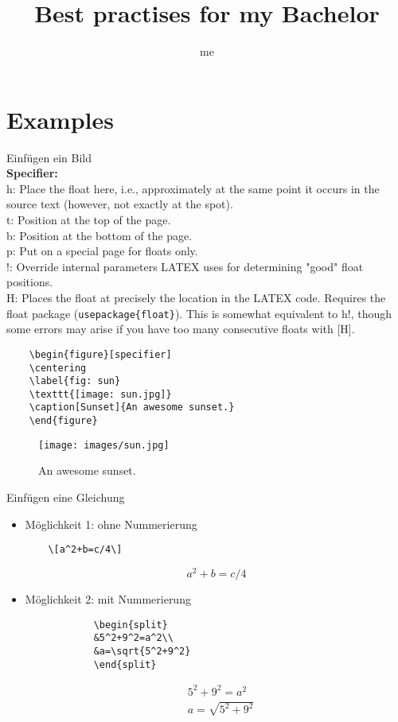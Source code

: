 \documentclass[a4paper, 12pt]{article}
\title{Best practises for my Bachelor}
\author{me \faMoonO}
\begin{document}
\maketitle
\setlength{\parindent}{0em}
\setlength{\parskip}{0.5em}
\renewcommand{\baselinestretch}{1}

\section{Examples}

\faChevronCircleRight\hspace{0.5cm} Einfügen ein Bild\\
\textbf{Specifier:}\\ h: Place the float here, i.e., approximately at the same 
point it occurs in the source text (however, not exactly at the spot).\\ t: 
Position at the top of the page.\\ b: Position at the bottom of the page.\\ 
p: Put on a special page for floats only.\\ !: 	Override internal parameters 
LATEX uses for determining "good" float positions.\\ H: Places the float at 
precisely the location in the LATEX code. Requires the float package 
(\verb|usepackage{float}|). This is somewhat equivalent to h!, though some 
errors may arise if you have too many consecutive floats with [H].
\begin{verbatim}
	\begin{figure}[specifier]
	\centering
	\label{fig: sun}
	\texttt{[image: sun.jpg]}
	\caption[Sunset]{An awesome sunset.}
	\end{figure}
\end{verbatim}
\begin{figure}[ht]
	\centering
	\label{fig: sun}
	\texttt{[image: images/sun.jpg]}
	\caption[Sunset]{An awesome sunset.}
\end{figure}
\pagebreak
\faChevronCircleRight\hspace{0.5cm} Einfügen eine Gleichung
\begin{itemize}
	\item Möglichkeit 1: ohne Nummerierung
	\begin{verbatim}
	\[a^2+b=c/4\]
	\end{verbatim}
	\[a^2+b=c/4\]
	\item Möglichkeit 2: mit Nummerierung
	\begin{verbatim}
			\begin{split}
			&5^2+9^2=a^2\\
			&a=\sqrt{5^2+9^2}
			\end{split}
	\end{verbatim}
\begin{equation}
	\begin{split}
	&5^2+9^2=a^2\\
	&a=\sqrt{5^2+9^2}
	\end{split}
\end{equation}
\end{itemize}
\end{document}
